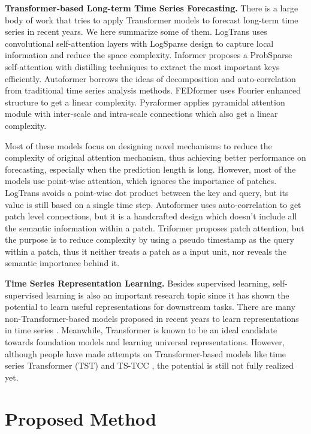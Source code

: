 \documentclass{article} %
\begin{document}
\textbf{Transformer-based Long-term Time Series Forecasting.} There is a large body of work that tries to apply Transformer models to forecast long-term time series in recent years. We here summarize some of them. LogTrans \citep{logtrans} uses convolutional self-attention layers with LogSparse design to capture local information and reduce the space complexity. Informer \citep{informer} proposes a ProbSparse self-attention with distilling techniques to extract the most important keys efficiently. Autoformer \citep{autoformer} borrows the ideas of decomposition and auto-correlation from traditional time series analysis methods. FEDformer \citep{fedformer} uses Fourier enhanced structure to get a linear complexity. Pyraformer \citep{pyraformer} applies pyramidal attention module with inter-scale and intra-scale connections which also get a linear complexity.

Most of these models focus on designing novel mechanisms to reduce the complexity of original attention mechanism, thus achieving better performance on forecasting, especially when the prediction length is long. However, most of the models use point-wise attention, which ignores the importance of patches. LogTrans \citep{logtrans} avoids a point-wise dot product between the key and query, but its value is still based on a single time step. Autoformer \citep{autoformer} uses auto-correlation to get patch level connections, but it is a handcrafted design which doesn't include all the semantic information within a patch. Triformer \citep{triformer} proposes patch attention, but the purpose is to reduce complexity by using a pseudo timestamp as the query within a patch, thus it neither treats a patch as a input unit, nor reveals the semantic importance behind it.

\textbf{Time Series Representation Learning.} Besides supervised learning, self-supervised learning is also an important research topic since it has shown the potential to learn useful representations for downstream tasks. There are many non-Transformer-based models proposed in recent years to learn representations in time series \citep{representation,tnc,btsf,ts2vec}. Meanwhile, Transformer is known to be an ideal candidate towards foundation models \citep{foundation} and learning universal representations. However, although people have made attempts on Transformer-based models like time series Transformer (TST) \citep{tst} and TS-TCC \citep{ts-tcc}, the potential is still not fully realized yet.

\section{Proposed Method}
\end{document}

